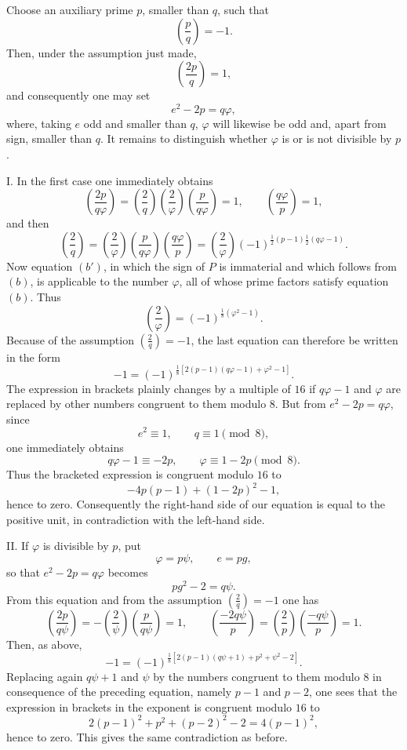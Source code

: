 \documentclass[11pt]{article}
\newcommand{\J}[2]{\left(\frac{#1}{#2}\right)}
\begin{document}
Choose an auxiliary prime $p$, smaller than $q$, such that
\[
 \J{p}{q}=-1.
\]
Then, under the assumption just made,
\[
 \J{2p}{q}=1,
\]
and consequently one may set
\[
 e^2-2p=q\varphi,
\]
where, taking $e$ odd and smaller than $q$, $\varphi$ will likewise be odd and, apart from sign, smaller than $q$. It remains to distinguish whether $\varphi$ is or is not divisible by $p$.

I. In the first case one immediately obtains
\[
 \J{2p}{q\varphi}=\J{2}{q}\J{2}{\varphi}\J{p}{q\varphi}=1,
\qquad
 \J{q\varphi}{p}=1,
\]
and then
\[
 \J{2}{q}=\J{2}{\varphi}\J{p}{q\varphi}\J{q\varphi}{p}
 =\J{2}{\varphi}(-1)^{\frac12(p-1)\frac12(q\varphi-1)}.
\]
Now equation $(b')$, in which the sign of $P$ is immaterial and which follows from $(b)$, is applicable to the number $\varphi$, all of whose prime factors satisfy equation $(b)$. Thus
\[
 \J{2}{\varphi}=(-1)^{\frac18(\varphi^2-1)}.
\]
Because of the assumption $\J{2}{q}=-1$, the last equation can therefore be written in the form
\[
 -1=(-1)^{\frac18[2(p-1)(q\varphi-1)+\varphi^2-1]}.
\]
The expression in brackets plainly changes by a multiple of $16$ if $q\varphi-1$ and $\varphi$ are replaced by other numbers congruent to them modulo $8$. But from $e^2-2p=q\varphi$, since
\[
 e^2\equiv1,
\qquad q\equiv1\pmod8,
\]
one immediately obtains
\[
 q\varphi-1\equiv-2p,
\qquad
 \varphi\equiv1-2p\pmod8.
\]
Thus the bracketed expression is congruent modulo $16$ to
\[
 -4p(p-1)+(1-2p)^2-1,
\]
hence to zero. Consequently the right-hand side of our equation is equal to the positive unit, in contradiction with the left-hand side.

II. If $\varphi$ is divisible by $p$, put
\[
 \varphi=p\psi,
\qquad e=pg,
\]
so that $e^2-2p=q\varphi$ becomes
\[
 pg^2-2=q\psi.
\]
From this equation and from the assumption $\J{2}{q}=-1$ one has
\[
 \J{2p}{q\psi}=-\J{2}{\psi}\J{p}{q\psi}=1,
\qquad
 \J{-2q\psi}{p}=\J{2}{p}\J{-q\psi}{p}=1.
\]
Then, as above,
\[
 -1=(-1)^{\frac18[2(p-1)(q\psi+1)+p^2+\psi^2-2]}.
\]
Replacing again $q\psi+1$ and $\psi$ by the numbers congruent to them modulo $8$ in consequence of the preceding equation, namely $p-1$ and $p-2$, one sees that the expression in brackets in the exponent is congruent modulo $16$ to
\[
 2(p-1)^2+p^2+(p-2)^2-2=4(p-1)^2,
\]
hence to zero. This gives the same contradiction as before.
\end{document}
